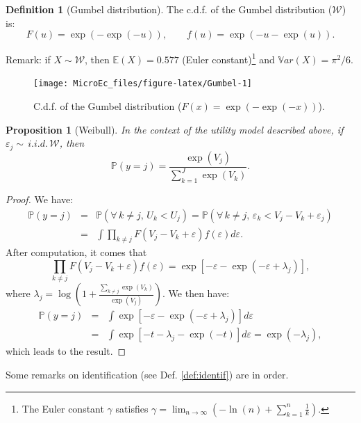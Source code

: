 \documentclass[
  12pt,
]{book}
\newtheorem{proposition}{Proposition}[chapter]
\theoremstyle{definition}
\newtheorem{definition}{Definition}[chapter]
\theoremstyle{definition}
\theoremstyle{definition}
\theoremstyle{definition}
\theoremstyle{remark}
\begin{document}
\begin{definition}[Gumbel distribution]
\protect\hypertarget{def:Gumbel}{}\label{def:Gumbel}The c.d.f. of the Gumbel distribution (\(\mathcal{W}\)) is:
\[
F(u) = \exp(-\exp(-u)), \qquad f(u)=\exp(-u-\exp(u)).
\]
\end{definition}

Remark: if \(X\sim\mathcal{W}\), then \(\mathbb{E}(X)=0.577\) (Euler constant)\footnote{The Euler constant \(\gamma\) satisfies \(\gamma = \lim_{n\rightarrow \infty} \left(- \ln(n) + \sum_{k=1}^n \frac{1}{k}\right)\).} and \(\mathbb{V}ar(X)=\pi^2/6\).

\begin{figure}
\texttt{[image: MicroEc\_files/figure-latex/Gumbel-1]} \caption{C.d.f. of the Gumbel distribution ($F(x)=\exp(-\exp(-x))$).}\label{fig:Gumbel}
\end{figure}

\begin{proposition}[Weibull]
\protect\hypertarget{prp:Weibull}{}\label{prp:Weibull}In the context of the utility model described above, if \(\varepsilon_j \sim \,i.i.d.\,\mathcal{W}\), then
\[
\mathbb{P}(y=j) = \frac{\exp(V_j)}{\sum_{k=1}^J \exp(V_k)}.
\]
\end{proposition}

\begin{proof}
We have:
\begin{eqnarray*}
\mathbb{P}(y=j) &=& \mathbb{P}(\forall\,k \ne j,\,U_k < U_j) =  \mathbb{P}(\forall\,k \ne j,\,\varepsilon_k < V_j - V_k + \varepsilon_j) \\
&=& \int \prod_{k \ne j} F(V_j - V_k + \varepsilon) f(\varepsilon)d\varepsilon.
\end{eqnarray*}
After computation, it comes that
\[
\prod_{k \ne j} F(V_j - V_k + \varepsilon) f(\varepsilon) = \exp\left[-\varepsilon-\exp(-\varepsilon+\lambda_j)\right],
\]
where \(\lambda_j = \log\left(1 + \frac{\sum_{k \ne j} \exp(V_k)}{\exp(V_j)}\right)\). We then have:
\begin{eqnarray*}
\mathbb{P}(y=j) &=& \int  \exp\left[-\varepsilon-\exp(-\varepsilon+\lambda_j)\right] d\varepsilon\\
&=& \int  \exp\left[-t - \lambda_j-\exp(-t)\right] d\varepsilon = \exp(- \lambda_j),
\end{eqnarray*}
which leads to the result.
\end{proof}

Some remarks on identification (see Def. \ref{def:identif}) are in order.
\end{document}
